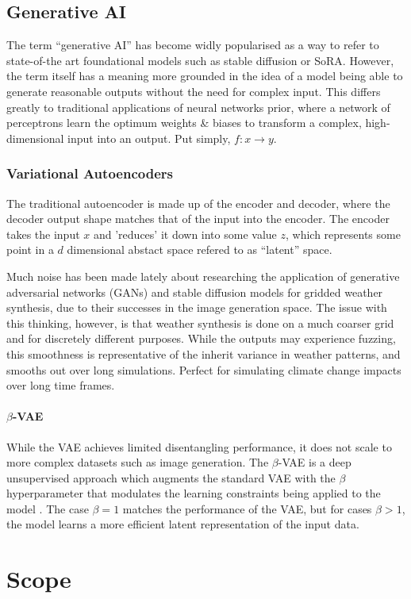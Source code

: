 \section{Generative AI}

The term ``generative AI'' has become widly popularised as a way to refer to state-of-the art 
foundational models such as stable diffusion or SoRA. However, the term itself has a meaning
more grounded in the idea of a model being able to generate reasonable outputs without the
need for complex input. This differs greatly to traditional applications of neural networks
prior, where a network of perceptrons learn the optimum weights \& biases to transform a 
complex, high-dimensional input into an output. Put simply, $f: x \rightarrow y$.

\subsection{Variational Autoencoders}

The traditional autoencoder is made up of the encoder and decoder, where the decoder output 
shape matches that of the input into the encoder. The encoder takes the input $x$ and 'reduces'
it down into some value $z$, which represents some point in a $d$ dimensional abstact space
refered to as ``latent'' space.

Much noise has been made lately about researching the application of generative adversarial
networks (GANs) and stable diffusion models for gridded weather synthesis, due to their 
successes in the image generation space. The issue with this thinking, however, is that 
weather synthesis is done on a much coarser grid and for discretely different purposes.
While the outputs may experience fuzzing, this smoothness is representative of the inherit
variance in weather patterns, and smooths out over long simulations. Perfect for simulating
climate change impacts over long time frames.

\subsubsection{$\beta$-VAE}

While the VAE achieves limited disentangling performance, it does not scale to more complex
datasets such as image generation. The $\beta$-VAE is a deep unsupervised approach which
augments the standard VAE with the $\beta$ hyperparameter that modulates the learning 
constraints being applied to the model \cite{beta-vae}. The case $\beta=1$ matches the 
performance of the VAE, but for cases $\beta>1$, the model learns a more efficient latent 
representation of the input data. 

\chapter{Scope} \label{Section:Scope}
